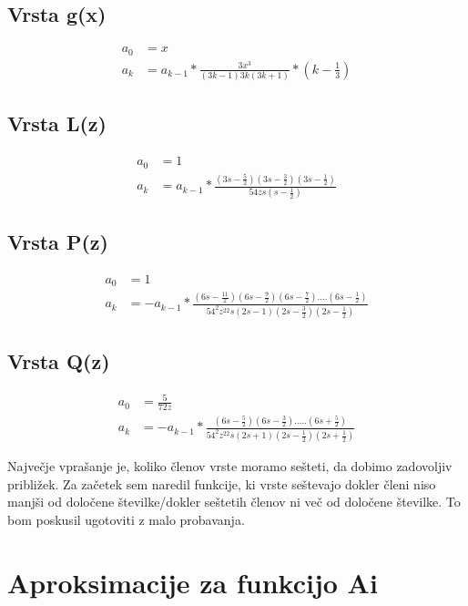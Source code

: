 \documentclass{article}
\begin{document}
\subsection{Vrsta g(x)}
\begin{align*}
a_0 &= x \\
a_k &= a_{k-1} * \frac{3x^3}{(3k-1)3k(3k+1)}*(k-\frac{1}{3})
\end{align*}

\subsection{Vrsta L(z)}
\begin{align*}
a_0 &= 1 \\
a_k &= a_{k-1} * \frac{(3s-\frac{5}{2})(3s-\frac{3}{2})(3s-\frac{1}{2})}{54zs(s-\frac{1}{2})}
\end{align*}

\subsection{Vrsta P(z)}
\begin{align*}
a_0 &= 1 \\
a_k &= -a_{k-1} *  \frac{(6s-\frac{11}{2})(6s-\frac{9}{2})(6s-\frac{7}{2})....(6s-\frac{1}{2})}{54^2z^22s(2s-1)(2s-\frac{3}{2})(2s-\frac{1}{2})}
\end{align*}

\subsection{Vrsta Q(z)}
\begin{align*}
a_0 &= \frac{5}{72z}\\
a_k &= -a_{k-1}* \frac{(6s-\frac{5}{2})(6s-\frac{3}{2}).....(6s+\frac{5}{2})}{54^2z^22s(2s+1)(2s-\frac{1}{2})(2s+\frac{1}{2})}
\end{align*}



Največje vprašanje je, koliko členov vrste moramo sešteti, da dobimo zadovoljiv približek. 
Za začetek sem naredil funkcije, ki vrste seštevajo dokler členi niso manjši od določene številke/dokler seštetih členov ni več od določene številke. To bom poskusil ugotoviti z malo probavanja.

\newpage

\section{Aproksimacije za funkcijo Ai}
\end{document}
